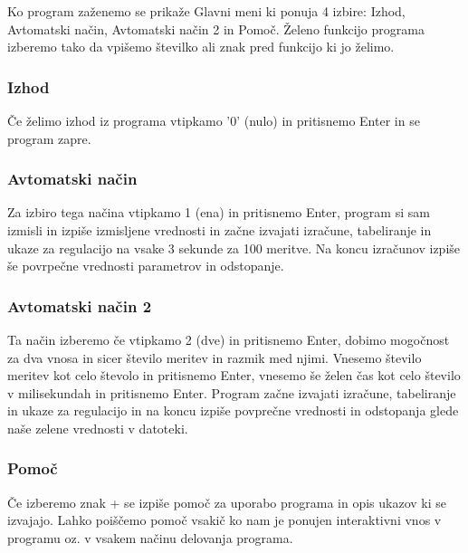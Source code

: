 \documentclass[a4paper,12pt]{article}
\begin{document}
	\quad Ko program zaženemo se prikaže Glavni meni ki ponuja 4 izbire: Izhod, Avtomatski način, Avtomatski način 2 in Pomoč. Želeno funkcijo 
	programa izberemo tako da vpišemo številko ali znak pred funkcijo ki jo želimo.

	\subsubsection{Izhod}

	\quad Če želimo izhod iz programa vtipkamo '0' (nulo) in pritisnemo Enter in se program zapre.

	\subsubsection{Avtomatski način}

	\quad Za izbiro tega načina vtipkamo 1 (ena) in pritisnemo Enter, program si sam izmisli in izpiše izmisljene vrednosti in začne
	izvajati izračune, tabeliranje in ukaze za regulacijo na vsake 3 sekunde za 100 meritve. Na koncu izračunov izpiše še
	povrpečne vrednosti parametrov in odstopanje.

	\subsubsection{Avtomatski način 2}

	\quad Ta način izberemo če vtipkamo 2 (dve) in pritisnemo Enter, dobimo mogočnost za dva vnosa in sicer število meritev in
	razmik med njimi. Vnesemo število meritev kot celo števolo in pritisnemo Enter, vnesemo še želen čas kot celo število v milisekundah
	in pritisnemo Enter. Program začne izvajati izračune, tabeliranje in ukaze za regulacijo in na koncu izpiše povprečne vrednosti in 
	odstopanja glede naše zelene vrednosti v datoteki.
	
	\subsubsection{Pomoč}

	\quad Če izberemo znak + se izpiše pomoč za uporabo programa in opis ukazov ki se izvajajo. Lahko poiščemo pomoč vsakič ko
	nam je ponujen interaktivni vnos v programu oz. v vsakem načinu delovanja programa.
\end{document}

